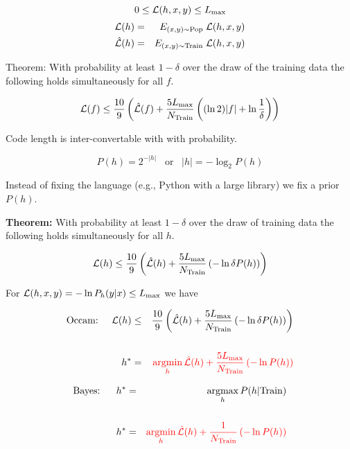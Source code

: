 {

\vfill
$$0 \leq {\cal L}(h,x,y) \leq L_{\max}$$
\begin{eqnarray*}
{\cal L}(h)  & = &  E_{(x,y)\sim \mathrm{Pop}}\;{\cal L}(h,x,y) \\
\hat{{\cal L}}(h) & = & E_{(x,y)\sim \mathrm{Train}}\;{\cal L}(h,x,y)
\end{eqnarray*}

\vfill
Theorem: With probability at least $1-\delta$ over the draw of the training data the following holds simultaneously for all $f$.

{\color{red} $${\cal L}(f) \leq \frac{10}{9}\left(\hat{{\cal L}}(f) + \frac{5L_{\max}}{N_\mathrm{Train}}\left((\ln 2)|f| +\ln\frac{1}{\delta}\right)\right)$$}



Code length is inter-convertable with with probability.

$$P(h) = 2^{-|h|}\;\;\;\mbox{or}\;\;\;|h| = - \log_2 P(h)$$

\vfill
Instead of fixing the language (e.g., Python with a large library) we fix a prior $P(h)$.

\vfill
    {\bf Theorem:} With probability
    at least $1-\delta$ over the draw of training data the following holds simultaneously for all $h$.

\vfill
    $${\cal L}(h) \leq \frac{10}{9}\left(\hat{\cal L}(h) + \frac{5 L_\mathrm{max}}{N_\mathrm{Train}}\left(- \ln \delta P(h)\right)\right)$$


For {\color{red} ${\cal L}(h,x,y) = -\ln P_h(y|x) \leq L_{\mathrm{max}}$} we have

\vfill
\begin{eqnarray*}
\mbox{Occam:}\;\;\;\;\;{\cal L}(h) & \leq & \frac{10}{9}\left(\hat{\cal L}(h) + \frac{5 L_\mathrm{max}}{N_\mathrm{Train}}\left(- \ln \delta P(h)\right)\right) \\
\\
h^* & = & {\color{red} \operatorname*{argmin}_h \hat{\cal L}(h) + \frac{5 L_\mathrm{max}}{N_\mathrm{Train}}\left(- \ln P(h)\right)}
\end{eqnarray*}

\vfill
\begin{eqnarray*}
\mbox{Bayes:}\;\;\;\;\;\;h^* & = & \operatorname*{argmax}_h P(h|\mathrm{Train}) \\
\\
h^* & = & {\color{red} \operatorname*{argmin}_h \hat{\cal L}(h) + \frac{1}{N_\mathrm{Train}}\left(- \ln P(h)\right)}
\end{eqnarray*}

}
